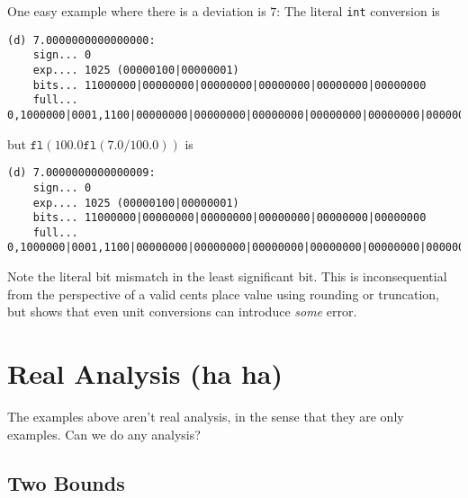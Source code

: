 \documentclass[11pt, oneside]{amsart}   	%
\begin{document}
One easy example where there is a deviation is $7$: The literal \texttt{int} conversion is
\begin{small}
\begin{verbatim}
(d) 7.0000000000000000:
    sign... 0
    exp.... 1025 (00000100|00000001)
    bits... 11000000|00000000|00000000|00000000|00000000|00000000
    full... 0,1000000|0001,1100|00000000|00000000|00000000|00000000|00000000|00000000
\end{verbatim}
\end{small}
but $\texttt{fl}(100.0\texttt{fl}(7.0/100.0))$ is
\begin{small}
\begin{verbatim}
(d) 7.0000000000000009:
    sign... 0
    exp.... 1025 (00000100|00000001)
    bits... 11000000|00000000|00000000|00000000|00000000|00000000
    full... 0,1000000|0001,1100|00000000|00000000|00000000|00000000|00000000|00000001
\end{verbatim}
\end{small}
Note the literal bit mismatch in the least significant bit. This is inconsequential from the perspective of a valid cents place value using rounding or truncation, but shows that even unit conversions can introduce {\em some} error. 

\section{Real Analysis (ha ha)}

The examples above aren't real analysis, in the sense that they are only examples. Can we do any analysis? 

\subsection{Two Bounds}
\end{document}
